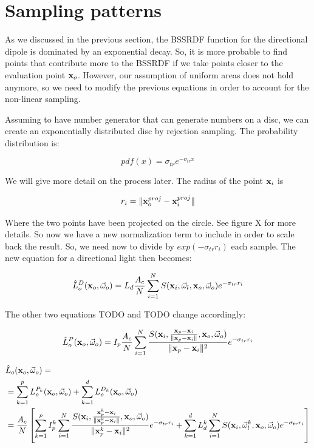 \section{Sampling patterns}
As we discussed in the previous section, the BSSRDF function for the directional dipole is dominated by an exponential decay. So, it is more probable to find points that contribute more to the BSSRDF if we take points closer to the evaluation point $\mathbf{x}_o$. However, our assumption of uniform areas does not hold anymore, so we need to modify the previous equations in order to account for the non-linear sampling.

Assuming to have number generator that can generate numbers on a disc, we can create an exponentially distributed disc by rejection sampling. The probability distribution is:

$$
pdf(x) = \sigma_{tr} e^{-\sigma_{tr} x}
$$

We will give more detail on the process later. The radius of the point $\mathbf{x}_i$ is 

$$
r_i = \|\mathbf{x}_o^{proj} - \mathbf{x}_i^{proj}\|
$$

Where the two points have been projected on the circle. See figure X for more details. So now we have a new normalization term to include in order to scale back the result. So, we need now to divide by $exp(-\sigma_{tr} r_i)$ each sample. The new equation for a directional light then becomes:

$$
\hat{L}_o^D(\mathbf{x}_o,\vec{\omega}_o) = L_d \frac{A_c}{N} \sum_{i = 1}^N S(\mathbf{x}_i, \vec{\omega}_l, \mathbf{x}_o, \vec{\omega}_o) e^{-\sigma_{tr} r_i}
$$

The other two equations TODO and TODO change accordingly:

$$
\hat{L}_o^P(\mathbf{x}_o,\vec{\omega}_o) = I_p \frac{A_c}{N} \sum_{i = 1}^N \frac{S(\mathbf{x}_i, \frac{\mathbf{x}_p - \mathbf{x}_i}{\|\mathbf{x}_p - \mathbf{x}_i\|}, \mathbf{x}_o, \vec{\omega}_o)}{\|\mathbf{x}_p - \mathbf{x}_i\|^2}  e^{-\sigma_{tr} r_i}
$$

\begin{equation}
\begin{split}
&\hat{L}_o(\mathbf{x}_o,\vec{\omega}_o) = \\
&= \sum_{k=1}^{p}L_o^{P_k}(\mathbf{x}_o,\vec{\omega}_o) + \sum_{k=1}^{d}L_o^{D_k}(\mathbf{x}_o,\vec{\omega}_o) \\
&= \frac{A_c}{N} \left[ \sum_{k=1}^{p}I_p^k \sum_{i = 1}^N \frac{S(\mathbf{x}_i, \frac{\mathbf{x}_p^k - \mathbf{x}_i}{\|\mathbf{x}_p^k - \mathbf{x}_i\|}, \mathbf{x}_o, \vec{\omega}_o)}{\|\mathbf{x}_p^k - \mathbf{x}_i\|^2} e^{-\sigma_{tr} r_i} + \sum_{k=1}^{d} L_d^k \sum_{i = 1}^N S(\mathbf{x}_i, \vec{\omega}^k_l, \mathbf{x}_o, \vec{\omega}_o) e^{-\sigma_{tr} r_i}\right] 
\end{split}
\end{equation}

